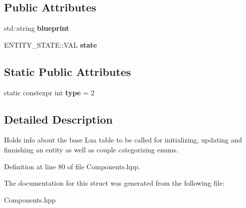 \subsection*{Public Attributes}
\begin{DoxyCompactItemize}
\item 
std\+::string {\bfseries blueprint}\hypertarget{struct_a_i_component_a3a20f445a5dad088d8fbd74a9b760d35}{}\label{struct_a_i_component_a3a20f445a5dad088d8fbd74a9b760d35}

\item 
E\+N\+T\+I\+T\+Y\+\_\+\+S\+T\+A\+T\+E\+::\+V\+AL {\bfseries state}\hypertarget{struct_a_i_component_a2ef9489c08d35aa23ee8d86d29592bef}{}\label{struct_a_i_component_a2ef9489c08d35aa23ee8d86d29592bef}

\end{DoxyCompactItemize}
\subsection*{Static Public Attributes}
\begin{DoxyCompactItemize}
\item 
static constexpr int {\bfseries type} = 2\hypertarget{struct_a_i_component_a1497db6f6f734a8bd6db23610fe19782}{}\label{struct_a_i_component_a1497db6f6f734a8bd6db23610fe19782}

\end{DoxyCompactItemize}


\subsection{Detailed Description}
Holds info about the base Lua table to be called for initializing, updating and finnishing an entity as well as couple categorizing enums. 

Definition at line 80 of file Components.\+hpp.



The documentation for this struct was generated from the following file\+:\begin{DoxyCompactItemize}
\item 
Components.\+hpp\end{DoxyCompactItemize}
